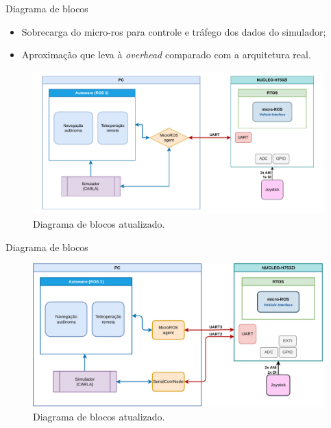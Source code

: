 \documentclass{if-beamer}
\begin{document}
\begin{frame}{Diagrama de blocos}
	
	\begin{block}{}
		
		\begin{itemize}
			\item Sobrecarga do micro-ros para controle e tráfego dos dados do simulador;
			\item Aproximação que leva à \textit{overhead} comparado com a arquitetura real.
			
		\end{itemize}
		
	\end{block}
	
	\begin{figure}[H]
		\centering
		\includegraphics[width=0.75\linewidth]{block_diagram_old}
		\caption{Diagrama de blocos atualizado.}
		\label{fig:block_diagram_old}
	\end{figure}
	
\end{frame}

\begin{frame}{Diagrama de blocos}
	
	\begin{figure}[H]
		\centering
		\includegraphics[width=0.9\linewidth]{block_diagram}
		\caption{Diagrama de blocos atualizado.}
		\label{fig:block_diagram}
	\end{figure}

\end{frame}
\end{document}
